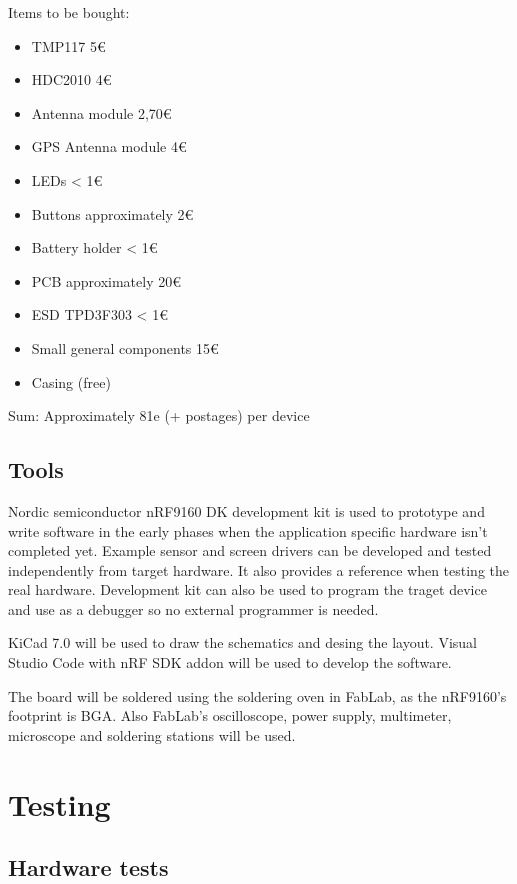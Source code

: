 \documentclass[]{dithesis}
\begin{document}
\bigskip

Items to be bought:
\begin{itemize}
    \item TMP117 5€
    \item HDC2010 4€
    \item Antenna module 2,70€
    \item GPS Antenna module 4€
    \item LEDs < 1€
    \item Buttons approximately 2€
    \item Battery holder < 1€
    \item PCB approximately 20€
    \item ESD TPD3F303 < 1€
    \item Small general components 15€
    \item Casing (free)

\end{itemize}
\bigskip
Sum: Approximately 81e (+ postages) per device

\section{Tools}

Nordic semiconductor nRF9160 DK development kit is used to prototype and write software in the early phases when the application specific hardware isn't completed yet. Example sensor and screen drivers can be developed and tested independently from target hardware. It also provides a reference when testing the real hardware. Development kit can also be used to program the traget device and use as a debugger so no external programmer is needed.

KiCad 7.0 will be used to draw the schematics and desing the layout. Visual Studio Code with nRF SDK addon will be used to develop the software. 

The board will be soldered using the soldering oven in FabLab, as the nRF9160's footprint is BGA. Also FabLab's oscilloscope, power supply, multimeter, microscope and soldering stations will be used. 

\chapter{Testing}
\section{Hardware tests}
\end{document}
